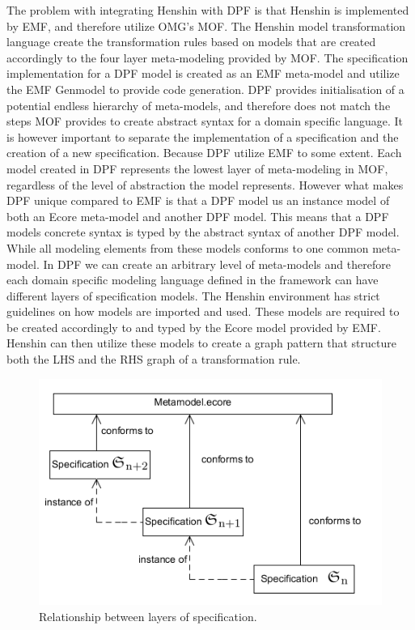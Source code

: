 The problem with integrating Henshin with DPF is that Henshin is implemented by
EMF, and therefore utilize OMG's MOF. The Henshin model transformation
language create the transformation rules based on models that are created
accordingly to the four layer meta-modeling provided by MOF. The
specification implementation for a DPF model is created as an EMF meta-model 
and utilize the EMF Genmodel to provide code generation. DPF provides
initialisation of a potential endless hierarchy of meta-models, and therefore
does not match the steps MOF provides to create abstract syntax for a domain
specific language. It is however important to separate the implementation of a
specification and the creation of a new specification. Because DPF utilize EMF
to some extent. Each model created in DPF represents the lowest layer of
meta-modeling in MOF, regardless of the level of abstraction the model
represents. However what makes DPF unique compared to EMF is that a DPF model us
an instance model of both an Ecore meta-model and another DPF model. This means
that a DPF models concrete syntax is typed by the abstract syntax of another DPF
model. While all modeling elements from these models conforms to one common
meta-model. In DPF we can create an arbitrary level of meta-models and therefore
each domain specific modeling language defined in the framework can have
different layers of specification models. The Henshin environment has strict
guidelines on how models are imported and used. These models are required to be
created accordingly to and typed by the Ecore model provided by EMF. Henshin
can then utilize these models to create a graph pattern that structure both the
LHS and the RHS graph of a transformation rule.

\begin{figure}[H]
	\centering
	\includegraphics[scale=0.7]{./Figures/metamodelSpecification.png}
	\caption[Specification relationship with core meta-model]
	{Relationship between layers of specification.}
	\label{fig:core_metamodel}
\end{figure}



